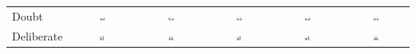 \documentclass[egregdoesnotlikesansseriftitles,12pt]{scrartcl}
\begin{document}
\begin{landscape}
\begin{table}[]
{\begin{tabular}{lccccc}
Doubt        & \includegraphics[width=0.1\textwidth]{figures/beha_3.pdf}   & \includegraphics[width=0.1\textwidth]{figures/verd_3.pdf}   & \includegraphics[width=0.1\textwidth]{figures/exer_3.pdf}   & \includegraphics[width=0.1\textwidth]{figures/comm_3.pdf}   & \includegraphics[width=0.1\textwidth]{figures/expo_3.pdf}   \\
Deliberate   & \includegraphics[width=0.1\textwidth]{figures/beha_4.pdf}   & \includegraphics[width=0.1\textwidth]{figures/verd_4.pdf}   & \includegraphics[width=0.1\textwidth]{figures/exer_4.pdf}   & \includegraphics[width=0.1\textwidth]{figures/comm_4.pdf}   & \includegraphics[width=0.1\textwidth]{figures/expo_4.pdf}   \\

\end{tabular}}
\end{table}
\end{landscape}
\end{document}
